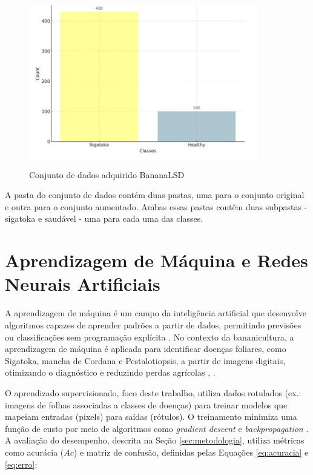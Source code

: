 \begin{figure}[!h]
	\centering
	\caption{Conjunto de dados adquirido \ac{BananaLSD}}
	\includegraphics[width=10cm]{figuras/classes Sigatoka e Healthy.jpg}\\
	\label{fig:Fig5}
\end{figure}

A pasta do conjunto de dados contém duas pastas, uma para o conjunto original e outra para o conjunto aumentado. Ambas essas pastas contêm duas subpastas - sigatoka e saudável - uma para cada uma das classes.


\section{Aprendizagem de Máquina e Redes Neurais Artificiais}
\label{sec:aprendizagem-maquina}

A aprendizagem de máquina é um campo da inteligência artificial que desenvolve algoritmos capazes de aprender padrões a partir de dados, permitindo previsões ou classificações sem programação explícita \cite{mitchell1997machine}. No contexto da bananicultura, a aprendizagem de máquina é aplicada para identificar doenças foliares, como Sigatoka, mancha de Cordana e Pestalotiopsis, a partir de imagens digitais, otimizando o diagnóstico e reduzindo perdas agrícolas \cite{RezendeTese}, \cite{DadosArt}.

O aprendizado supervisionado, foco deste trabalho, utiliza dados rotulados (ex.: imagens de folhas associadas a classes de doenças) para treinar modelos que mapeiam entradas (pixels) para saídas (rótulos). O treinamento minimiza uma função de custo por meio de algoritmos como \textit{gradient descent} e \textit{backpropagation} \cite{Rumelhart1986}. A avaliação do desempenho, descrita na Seção \textcolor{red}{\ref{sec:metodologia}}, utiliza métricas como acurácia (\(Ac\)) e matriz de confusão, definidas pelas Equações \ref{eq:acuracia} e \ref{eq:erro}:

